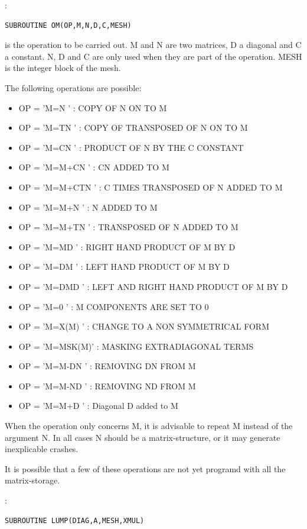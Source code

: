 :
\begin{lstlisting}[language=TelFortran]
SUBROUTINE OM(OP,M,N,D,C,MESH)
\end{lstlisting}

 is the operation to be carried out. M and N are two matrices, D a diagonal
and C a constant. N, D and C are only used when they are part of the operation.
MESH is the integer block of the mesh.

The following operations are possible:
\begin{itemize}
  \item OP = 'M=N     ' : COPY OF N ON TO M
  \item OP = 'M=TN    ' : COPY OF TRANSPOSED OF N ON TO M
  \item OP = 'M=CN    ' : PRODUCT OF N BY THE C CONSTANT
  \item OP = 'M=M+CN  ' : CN ADDED TO M
  \item OP = 'M=M+CTN ' : C TIMES TRANSPOSED OF N ADDED TO M
  \item OP = 'M=M+N   ' : N ADDED TO M
  \item OP = 'M=M+TN  ' : TRANSPOSED OF N ADDED TO M
  \item OP = 'M=MD    ' : RIGHT HAND PRODUCT OF M BY D
  \item OP = 'M=DM    ' : LEFT HAND PRODUCT OF M BY D
  \item OP = 'M=DMD   ' : LEFT AND RIGHT HAND PRODUCT OF M BY D
  \item OP = 'M=0     ' : M COMPONENTS ARE SET TO 0
  \item OP = 'M=X(M)  ' : CHANGE TO A NON SYMMETRICAL FORM
  \item OP = 'M=MSK(M)' : MASKING EXTRADIAGONAL TERMS
  \item OP = 'M=M-DN  ' : REMOVING DN FROM M
  \item OP = 'M=M-ND  ' : REMOVING ND FROM M
  \item OP = 'M=M+D   ' : Diagonal D added to M
\end{itemize}

When the operation only concerns M, it is advisable to repeat M instead of the
argument N. In all cases N should be a matrix-structure, or it may generate
inexplicable crashes.

It is possible that a few of these operations are not yet programd with all
the matrix-storage.

:
\begin{lstlisting}[language=TelFortran]
SUBROUTINE LUMP(DIAG,A,MESH,XMUL)
\end{lstlisting}

